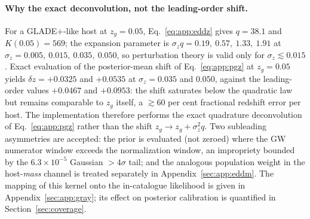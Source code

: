 \paragraph*{Why the exact deconvolution, not the leading-order shift.}
For a GLADE+-like host at $z_g = 0.05$, Eq.~\eqref{eq:app:eddz} gives
$q = 38.1$ and $K(0.05) = 569$; the expansion parameter is
$\sigma_z q = 0.19,\ 0.57,\ 1.33,\ 1.91$ at
$\sigma_z = 0.005,\ 0.015,\ 0.035,\ 0.050$, so perturbation theory is valid
only for $\sigma_z \lesssim 0.015$.
Exact evaluation of the posterior-mean shift of Eq.~\eqref{eq:app:pgz} at
$z_g = 0.05$ yields $\delta z = +0.0325$ and $+0.0535$ at
$\sigma_z = 0.035$ and $0.050$, against the leading-order values $+0.0467$
and $+0.0953$:
the shift saturates below the quadratic law but remains comparable to $z_g$
itself, a $\gtrsim 60$ per cent fractional redshift error per host. The
implementation therefore performs the exact quadrature deconvolution of
Eq.~\eqref{eq:app:pgz} rather than the shift
$z_g \to z_g + \sigma_z^2 q$. Two subleading asymmetries are accepted: the
prior is evaluated (not zeroed) where the GW numerator window exceeds the
normalization window, an impropriety bounded by the $6.3\times10^{-5}$
Gaussian $>\!4\sigma$ tail;
and the analogous population weight in the host-\emph{mass} channel is
treated separately in Appendix~\ref{sec:app:eddm}. The mapping of this
kernel onto the \citet{Gray:2019ksv} in-catalogue likelihood is given in
Appendix~\ref{sec:app:gray}; its effect on posterior calibration is
quantified in Section~\ref{sec:coverage}.
